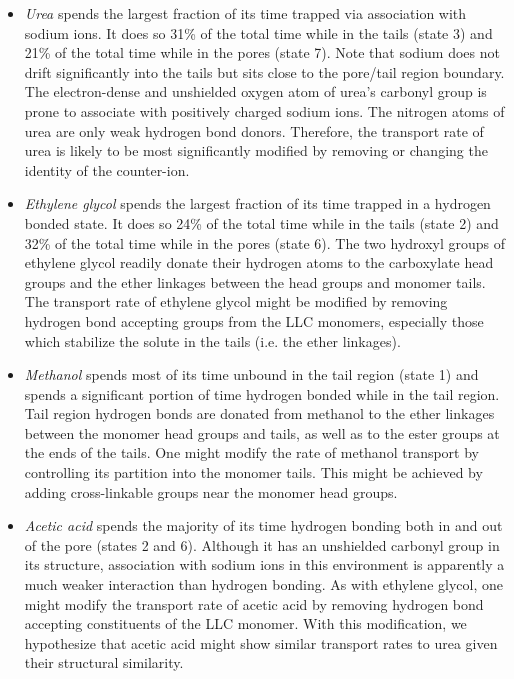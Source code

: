 \documentclass[journal=jctcce,manuscript=article]{achemso}
\begin{document}
  \begin{itemize}
  \item \textit{Urea} spends the largest fraction of its time trapped via association with
  sodium ions. It does so 31\% of the total time while in the tails (state 3)
  and 21\% of the total time while in the pores (state 7). Note that sodium
  does not drift significantly into the tails but sits close to the pore/tail
  region boundary. The electron-dense and unshielded oxygen atom of urea's
  carbonyl group is prone to associate with positively charged sodium ions. The
  nitrogen atoms of urea are only weak hydrogen bond donors. Therefore, the
  transport rate of urea is likely to be most significantly modified by
  removing or changing the identity of the counter-ion.
  
  \item \textit{Ethylene glycol} spends the largest fraction of its time trapped in a hydrogen
  bonded state. It does so 24\% of the total time while in the tails (state 2)
  and 32\% of the total time while in the pores (state 6). The two hydroxyl
  groups of ethylene glycol readily donate their hydrogen atoms to the
  carboxylate head groups and the ether linkages between the head groups and
  monomer tails. The transport rate of ethylene glycol might be modified by
  removing hydrogen bond accepting groups from the LLC monomers, especially
  those which stabilize the solute in the tails (i.e. the ether linkages). 
  
  \item \textit{Methanol} spends most of its time unbound in the tail region (state 1) and
  spends a significant portion of time hydrogen bonded while in the tail
  region. Tail region hydrogen bonds are donated from methanol to the ether
  linkages between the monomer head groups and tails, as well as to the ester groups
  at the ends of the tails. One might modify the
  rate of methanol transport by controlling its partition into the monomer
  tails. This might be achieved by adding cross-linkable groups near the
  monomer head groups.
  
  \item \textit{Acetic acid} spends the majority of its time hydrogen bonding both in
  and out of the pore (states 2 and 6). Although it has an unshielded carbonyl
  group in its structure, association with sodium ions in this environment is
  apparently a much weaker interaction than hydrogen bonding.  As with ethylene
  glycol, one might modify the transport rate of acetic acid by removing
  hydrogen bond accepting constituents of the LLC monomer. With this
  modification, we hypothesize that acetic acid might show similar transport
  rates to urea given their structural similarity.
  \end{itemize}
  
\end{document}
